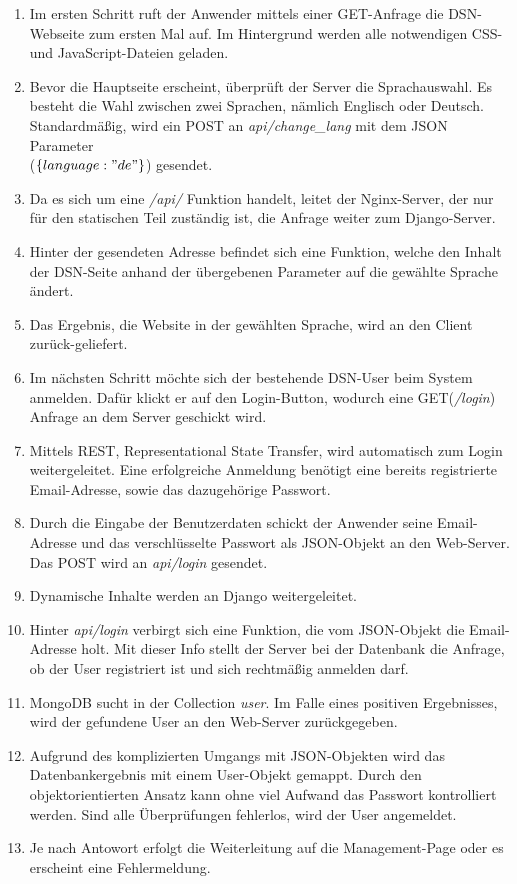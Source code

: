 \begin{enumerate}
\item Im ersten Schritt ruft der Anwender mittels einer GET-Anfrage die DSN-Webseite zum ersten Mal auf. Im Hintergrund werden alle notwendigen CSS- und JavaScript-Dateien geladen.
\item Bevor die Hauptseite erscheint, überprüft der Server die Sprachauswahl. Es besteht die Wahl zwischen zwei Sprachen, nämlich Englisch oder Deutsch.\\
Standardmäßig, wird ein POST an \textit{api/change\_lang} mit dem JSON Parameter\\
($\{language:"de"\}$) gesendet.
\item Da es sich um eine \textit{/api/} Funktion handelt, leitet der Nginx-Server, der nur für den statischen Teil zuständig ist, die Anfrage weiter zum Django-Server.
\item Hinter der gesendeten Adresse befindet sich eine Funktion, welche den Inhalt der DSN-Seite anhand der übergebenen Parameter auf die gewählte Sprache ändert.
\item Das Ergebnis, die Website in der gewählten Sprache, wird an den Client zurück-geliefert.
\item Im nächsten Schritt möchte sich der bestehende DSN-User beim System anmelden. Dafür klickt er auf den Login-Button, wodurch eine GET(\textit{/login}) Anfrage an dem Server geschickt wird.
\item Mittels \gls{REST}, Representational State Transfer, wird automatisch zum Login weitergeleitet. Eine erfolgreiche Anmeldung benötigt eine bereits registrierte Email-Adresse, sowie das dazugehörige Passwort.
\item Durch die Eingabe der Benutzerdaten schickt der Anwender seine Email-Adresse und das verschlüsselte Passwort als JSON-Objekt an den Web-Server. Das POST wird an \textit{api/login} gesendet.
\item Dynamische Inhalte werden an Django weitergeleitet.
\item Hinter \textit{api/login} verbirgt sich eine Funktion, die vom JSON-Objekt die Email-Adresse holt. Mit dieser Info stellt der Server bei der Datenbank die Anfrage, ob der User registriert ist und sich rechtmäßig anmelden darf.
\item MongoDB sucht in der Collection \textit{user}. Im Falle eines positiven Ergebnisses, wird der gefundene User an den Web-Server zurückgegeben.
\item Aufgrund des komplizierten Umgangs mit JSON-Objekten wird das Datenbankergebnis mit einem User-Objekt gemappt. Durch den objektorientierten Ansatz kann ohne viel Aufwand das Passwort kontrolliert werden. Sind alle Überprüfungen fehlerlos, wird der User angemeldet.
\item Je nach Antowort erfolgt die Weiterleitung auf die Management-Page oder es erscheint eine Fehlermeldung.
\end{enumerate}

